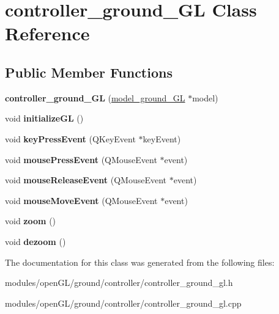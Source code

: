 \hypertarget{classcontroller__ground__GL}{\section{controller\-\_\-ground\-\_\-\-G\-L Class Reference}
\label{classcontroller__ground__GL}
}
\subsection*{Public Member Functions}
\begin{DoxyCompactItemize}
\item 
\hypertarget{classcontroller__ground__GL_a5e2c2ca1e696c4629e0c4cf647b4d150}{{\bfseries controller\-\_\-ground\-\_\-\-G\-L} (\hyperlink{classmodel__ground__GL}{model\-\_\-ground\-\_\-\-G\-L} $\ast$model)}\label{classcontroller__ground__GL_a5e2c2ca1e696c4629e0c4cf647b4d150}

\item 
\hypertarget{classcontroller__ground__GL_a88f9f5a5e3546516c96a71f7f3d08867}{void {\bfseries initialize\-G\-L} ()}\label{classcontroller__ground__GL_a88f9f5a5e3546516c96a71f7f3d08867}

\item 
\hypertarget{classcontroller__ground__GL_aa955e96f368cfbf2bb9daba3019c2fb4}{void {\bfseries key\-Press\-Event} (Q\-Key\-Event $\ast$key\-Event)}\label{classcontroller__ground__GL_aa955e96f368cfbf2bb9daba3019c2fb4}

\item 
\hypertarget{classcontroller__ground__GL_af4873b68ac38eb386f3359b2d8207ef9}{void {\bfseries mouse\-Press\-Event} (Q\-Mouse\-Event $\ast$event)}\label{classcontroller__ground__GL_af4873b68ac38eb386f3359b2d8207ef9}

\item 
\hypertarget{classcontroller__ground__GL_a08720d4fdcb1dd125d7c28fd37c15222}{void {\bfseries mouse\-Release\-Event} (Q\-Mouse\-Event $\ast$event)}\label{classcontroller__ground__GL_a08720d4fdcb1dd125d7c28fd37c15222}

\item 
\hypertarget{classcontroller__ground__GL_aa0db8cdc102837daaaf635362cf9c747}{void {\bfseries mouse\-Move\-Event} (Q\-Mouse\-Event $\ast$event)}\label{classcontroller__ground__GL_aa0db8cdc102837daaaf635362cf9c747}

\item 
\hypertarget{classcontroller__ground__GL_a2936e71b98a38b66e3fa09afe1538506}{void {\bfseries zoom} ()}\label{classcontroller__ground__GL_a2936e71b98a38b66e3fa09afe1538506}

\item 
\hypertarget{classcontroller__ground__GL_a747914c093fc33b5c4e3f25b71ef0fb1}{void {\bfseries dezoom} ()}\label{classcontroller__ground__GL_a747914c093fc33b5c4e3f25b71ef0fb1}

\end{DoxyCompactItemize}


The documentation for this class was generated from the following files\-:\begin{DoxyCompactItemize}
\item 
modules/open\-G\-L/ground/controller/controller\-\_\-ground\-\_\-gl.\-h\item 
modules/open\-G\-L/ground/controller/controller\-\_\-ground\-\_\-gl.\-cpp\end{DoxyCompactItemize}
